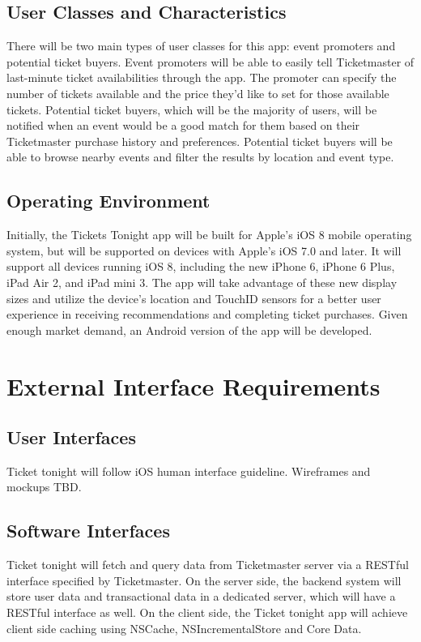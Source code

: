\documentclass{article}
\begin{document}
		\subsection{User Classes and Characteristics}
		 There will be two main types of user classes for this app: event promoters and potential ticket buyers. Event promoters will be able to easily tell Ticketmaster of last-minute ticket availabilities through the app. The promoter can specify the number of tickets available and the price they’d like to set for those available tickets. Potential ticket buyers, which will be the majority of users, will be notified when an event would be a good match for them based on their Ticketmaster purchase history and preferences. Potential ticket buyers will be able to browse nearby events and filter the results by location and event type. 
		 \subsection{Operating Environment}
		 Initially, the Tickets Tonight app will be built for Apple’s iOS 8 mobile operating system, but will be supported on devices with Apple’s iOS 7.0 and later. It will support all devices running iOS 8, including the new iPhone 6, iPhone 6 Plus, iPad Air 2, and iPad mini 3.  The app will take advantage of these new display sizes and utilize the device’s location and TouchID sensors for a better user experience in receiving recommendations and completing ticket purchases. Given enough market demand, an Android version of the app will be developed. 
	
	\section{External Interface Requirements}
		\subsection{User Interfaces}
			Ticket tonight will follow iOS human interface guideline. Wireframes and mockups TBD.
		\subsection{Software Interfaces}
			Ticket tonight will fetch and query data from Ticketmaster server via a RESTful interface specified by Ticketmaster. On the server side, the backend system will store user data and transactional data in a dedicated server, which will have a RESTful interface as well. On the client side, the Ticket tonight app will achieve client side caching using NSCache, NSIncrementalStore and Core Data.
	
\end{document}
